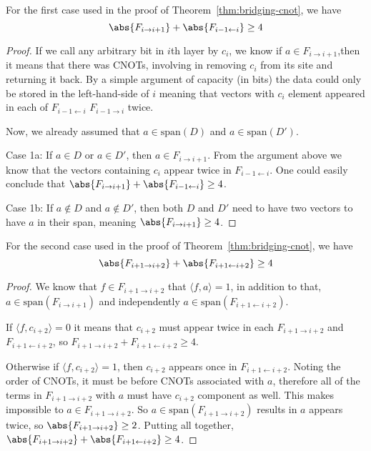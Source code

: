 \begin{lemma}
  For the first case used in the proof of Theorem~\ref{thm:bridging-cnot}, we have 
  \begin{equation}
    \abs{F_{i \rightarrow i+1}} + \abs{F_{i-1 \leftarrow i}} \geq 4
  \end{equation}
\end{lemma}
\begin{proof}
  If we call any arbitrary bit in $i$th layer by $c_i$, we know if $a \in F_{i \rightarrow i + 1}$,then it means that there was CNOTs, involving in removing $c_i$ from its site and returning it back. By a simple argument of capacity (in bits) the data could only be stored in the left-hand-side of $i$ meaning that vectors with $c_i$ element appeared in each of $F_{i-1 \leftarrow i}$ $F_{i-1 \rightarrow i}$ twice.

  Now, we already assumed that $a \in \mathrm{span}(D)$ and $a \in \mathrm{span}(D')$. 

  Case 1a: If $a \in D$ or $a \in D'$, then $a \in F_{i \rightarrow {i+1}}$. From the argument above we know that the vectors containing $c_i$ appear twice in $F_{i-1 \leftarrow i}$. One could easily conclude that $\abs{F_{i \rightarrow i+1}} + \abs{F_{i-1 \leftarrow i}} \geq 4$. 

  Case 1b: If $a \notin D$ and $a \notin D'$, then both $D$ and $D'$ need to have two vectors to have $a$ in their span, meaning $\abs{F_{i \rightarrow i+1}} \geq 4$.
\end{proof}

\begin{lemma}
  For the second case used in the proof of Theorem~\ref{thm:bridging-cnot}, we have 
  \begin{equation}
    \abs{F_{i+1 \rightarrow i+2}} + \abs{F_{i+1 \leftarrow i+2}} \geq 4
  \end{equation}
\end{lemma}
\begin{proof}
  We know that $f \in F_{i+1 \rightarrow i+2}$ that $\langle f, a \rangle = 1$, in addition to that, $
  a \in \mathrm{span}(F_{i \rightarrow i+1})$ and independently $a \in \mathrm{span}(F_{i+1 \leftarrow i+2})$.

  If $\langle f, c_{i+2} \rangle = 0$ it means that $c_{i+2}$ must appear twice in each $F_{i+1 \rightarrow i+2}$ and $F_{i+1 \leftarrow i+2}$, so $F_{i+1 \rightarrow i+2} + F_{i+1 \leftarrow i+2} \geq 4$.

  Otherwise if $\langle f, c_{i+2} \rangle = 1$, then $c_{i+2}$ appears once in $F_{i+1 \leftarrow i+2}$. Noting the order of CNOTs, it must be before CNOTs associated with $a$, therefore all of the terms in $F_{i+1 \rightarrow i+2}$ with $a$ must have $c_{i+2}$ component as well. This makes impossible to $a \in F_{i+1 \rightarrow i+2}$. So $a \in \mathrm{span}(F_{i+1 \rightarrow i+2})$ results in $a$ appears twice, so $\abs{F_{i+1 \rightarrow i+2}} \geq 2$. Putting all together, $\abs{F_{i+1 \rightarrow i+2}} + \abs{F_{i+1 \leftarrow i+2}} \geq 4$.
\end{proof}

